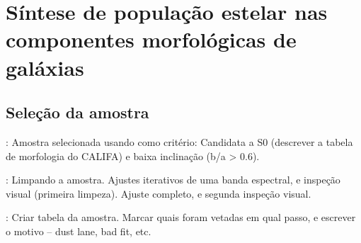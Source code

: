 


\chapter{Síntese de população estelar nas componentes morfológicas de galáxias}
\label{sec:Decomp}


\section{Seleção da amostra}

\TODO: Amostra selecionada usando como critério: Candidata a S0 (descrever a
tabela de morfologia do CALIFA) e baixa inclinação (b/a > 0.6).

\TODO: Limpando a amostra. Ajustes iterativos de uma banda espectral, e inspeção
visual (primeira limpeza). Ajuste completo, e segunda inspeção visual.

\TODO: Criar tabela da amostra. Marcar quais foram vetadas em qual passo, e
escrever o motivo -- dust lane, bad fit, etc.


